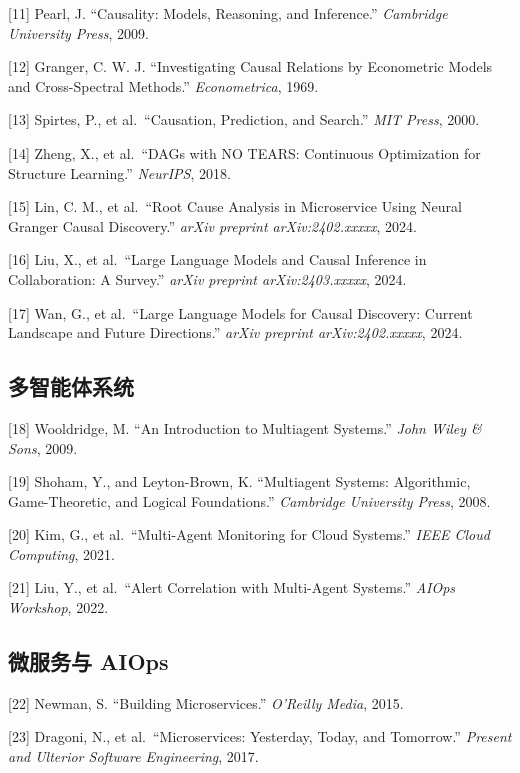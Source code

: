{[}11{]} Pearl, J. ``Causality: Models, Reasoning, and Inference.''
\emph{Cambridge University Press}, 2009.

{[}12{]} Granger, C. W. J. ``Investigating Causal Relations by
Econometric Models and Cross-Spectral Methods.'' \emph{Econometrica},
1969.

{[}13{]} Spirtes, P., et al.~``Causation, Prediction, and Search.''
\emph{MIT Press}, 2000.

{[}14{]} Zheng, X., et al.~``DAGs with NO TEARS: Continuous Optimization
for Structure Learning.'' \emph{NeurIPS}, 2018.

{[}15{]} Lin, C. M., et al.~``Root Cause Analysis in Microservice Using
Neural Granger Causal Discovery.'' \emph{arXiv preprint
arXiv:2402.xxxxx}, 2024.

{[}16{]} Liu, X., et al.~``Large Language Models and Causal Inference in
Collaboration: A Survey.'' \emph{arXiv preprint arXiv:2403.xxxxx}, 2024.

{[}17{]} Wan, G., et al.~``Large Language Models for Causal Discovery:
Current Landscape and Future Directions.'' \emph{arXiv preprint
arXiv:2402.xxxxx}, 2024.

\hypertarget{ux591aux667aux80fdux4f53ux7cfbux7edf}{%
\subsection{多智能体系统}\label{ux591aux667aux80fdux4f53ux7cfbux7edf}}

{[}18{]} Wooldridge, M. ``An Introduction to Multiagent Systems.''
\emph{John Wiley \& Sons}, 2009.

{[}19{]} Shoham, Y., and Leyton-Brown, K. ``Multiagent Systems:
Algorithmic, Game-Theoretic, and Logical Foundations.'' \emph{Cambridge
University Press}, 2008.

{[}20{]} Kim, G., et al.~``Multi-Agent Monitoring for Cloud Systems.''
\emph{IEEE Cloud Computing}, 2021.

{[}21{]} Liu, Y., et al.~``Alert Correlation with Multi-Agent Systems.''
\emph{AIOps Workshop}, 2022.

\hypertarget{ux5faeux670dux52a1ux4e0e-aiops}{%
\subsection{微服务与 AIOps}\label{ux5faeux670dux52a1ux4e0e-aiops}}

{[}22{]} Newman, S. ``Building Microservices.'' \emph{O'Reilly Media},
2015.

{[}23{]} Dragoni, N., et al.~``Microservices: Yesterday, Today, and
Tomorrow.'' \emph{Present and Ulterior Software Engineering}, 2017.

